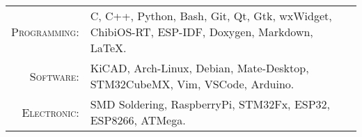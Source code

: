 %
%



\renewcommand{\arraystretch}{1.1}

	\begin{tabular}{>{}r>{}p{13cm}}
		\textsc{Programming:} &  C, C++, Python, Bash, Git, Qt, Gtk, wxWidget, ChibiOS-RT, ESP-IDF, Doxygen, Markdown, \LaTeX.\\
		\textsc{Software:}    &  KiCAD, Arch-Linux, Debian, Mate-Desktop, STM32CubeMX, Vim, VSCode, Arduino.\\
		\textsc{Electronic:}  &  SMD Soldering, RaspberryPi, STM32Fx, ESP32, ESP8266, ATMega.\\
	\end{tabular}